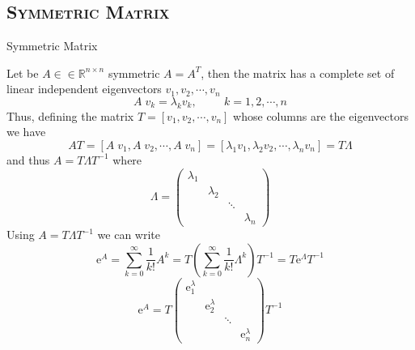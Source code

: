 \documentclass[xcolor=x11names,compress]{beamer}
\renewcommand{\(}{\begin{columns}}
\renewcommand{\)}{\end{columns}}
\newcommand{\<}[1]{\begin{column}{#1}}
\renewcommand{\>}{\end{column}}
\begin{document}
\subsection{\scshape Symmetric Matrix}
\begin{frame}{Symmetric Matrix}
\begin{tiny}Let be $A ∈\in \mathbb{R}^{n\times n}$ symmetric $A = A^T$, then the matrix has a complete set of linear independent eigenvectors $v_1, v_2,\cdots,v_n$
\begin{equation*}
A\;v_k = \lambda_k v_k,\hspace{1cm} k = 1,2,\cdots,n
\end{equation*}
Thus, defining the matrix $T = [v_1, v_2,\cdots,v_n]$ whose columns are the eigenvectors we have
\begin{equation*}
 AT = [A\;v_1, A\;v_2,\cdots, A\;v_n ] = [\lambda_1 v_1, \lambda_2 v_2 ,\cdots, \lambda_n v_n ] = T \Lambda
\end{equation*}
and thus $A = T \Lambda T^{-1}$ where
\[\Lambda = \left( \begin{array}{cccc}
\lambda_1 &           &  & \\
          & \lambda_2 &  & \\
          &           & \ddots & \\          
          &           &  & \lambda_n \end{array} \right)\] 
Using $A = T \Lambda T^{-1}$ we can write     
\begin{equation*}
 \mathrm{e}^A = \displaystyle\sum_{k=0}^{\infty}\frac{1}{k!} A^k =  T \left(\displaystyle\sum_{k=0}^{\infty}\frac{1}{k!} \Lambda^k\right) T^{-1} = T\mathrm{e}^{\Lambda}T^{-1}
\end{equation*}
\[\mathrm{e}^A = T \left(\begin{array}{cccc}
\mathrm{e}^\lambda_1 &           &  & \\
          & \mathrm{e}^\lambda_2 &  & \\
          &           & \ddots & \\          
          &           &  & \mathrm{e}^\lambda_n \end{array} \right) T^{-1}\]
\end{tiny} 
\end{frame}
\end{document}
